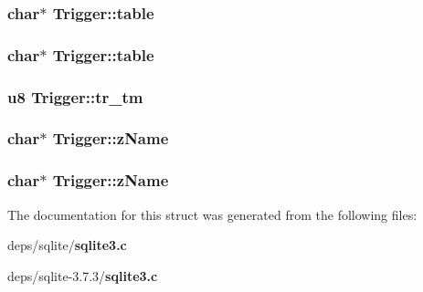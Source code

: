 \subsubsection{\setlength{\rightskip}{0pt plus 5cm}char$\ast$ \bf{Trigger::table}}\label{structTrigger_9d6798a1e0ed7cc4b35ee2f1c395657a}


\subsubsection{\setlength{\rightskip}{0pt plus 5cm}char$\ast$ \bf{Trigger::table}}\label{structTrigger_9d6798a1e0ed7cc4b35ee2f1c395657a}


\subsubsection{\setlength{\rightskip}{0pt plus 5cm}\bf{u8} \bf{Trigger::tr\_\-tm}}\label{structTrigger_3153c5171d93d0abd23e0457f7d80bf7}


\subsubsection{\setlength{\rightskip}{0pt plus 5cm}char$\ast$ \bf{Trigger::z\-Name}}\label{structTrigger_32c16e10f28c1b714f1e629e8265ea5f}


\subsubsection{\setlength{\rightskip}{0pt plus 5cm}char$\ast$ \bf{Trigger::z\-Name}}\label{structTrigger_32c16e10f28c1b714f1e629e8265ea5f}




The documentation for this struct was generated from the following files:\begin{CompactItemize}
\item 
deps/sqlite/\bf{sqlite3.c}\item 
deps/sqlite-3.7.3/\bf{sqlite3.c}\end{CompactItemize}
